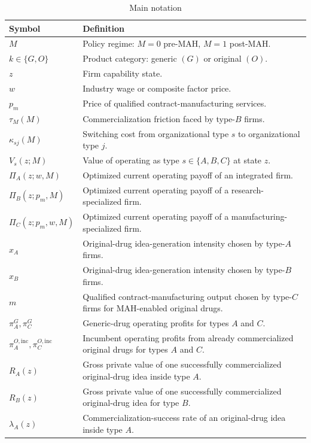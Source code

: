 \documentclass[12pt]{article}
\newcommand{\1}{\mathbf{1}}
\begin{document}
\begin{table}[htbp]
\centering
\caption{Main notation}
\label{tab:notation}
\footnotesize
\begin{tabular}{p{}p{}}
\toprule
Symbol & Definition \\
\midrule
$M$ & Policy regime: $M=0$ pre-MAH, $M=1$ post-MAH. \\
$k\in\{G,O\}$ & Product category: generic $(G)$ or original $(O)$. \\
$z$ & Firm capability state. \\
$w$ & Industry wage or composite factor price. \\
$p_m$ & Price of qualified contract-manufacturing services. \\
$\tau_M(M)$ & Commercialization friction faced by type-$B$ firms. \\
$\kappa_{sj}(M)$ & Switching cost from organizational type $s$ to organizational type $j$. \\
$V_s(z;M)$ & Value of operating as type $s\in\{A,B,C\}$ at state $z$. \\
$\Pi_A(z;w,M)$ & Optimized current operating payoff of an integrated firm. \\
$\Pi_B(z;p_m,M)$ & Optimized current operating payoff of a research-specialized firm. \\
$\Pi_C(z;p_m,w,M)$ & Optimized current operating payoff of a manufacturing-specialized firm. \\
$x_A$ & Original-drug idea-generation intensity chosen by type-$A$ firms. \\
$x_B$ & Original-drug idea-generation intensity chosen by type-$B$ firms. \\
$m$ & Qualified contract-manufacturing output chosen by type-$C$ firms for MAH-enabled original drugs. \\
$\pi_A^G,\pi_C^G$ & Generic-drug operating profits for types $A$ and $C$. \\
$\pi_A^{O,\mathrm{inc}},\pi_C^{O,\mathrm{inc}}$ & Incumbent operating profits from already commercialized original drugs for types $A$ and $C$. \\
$R_A(z)$ & Gross private value of one successfully commercialized original-drug idea inside type $A$. \\
$R_B(z)$ & Gross private value of one successfully commercialized original-drug idea for type $B$. \\
$\lambda_A(z)$ & Commercialization-success rate of an original-drug idea inside type $A$. \\

\end{tabular}
\end{table}
\end{document}
